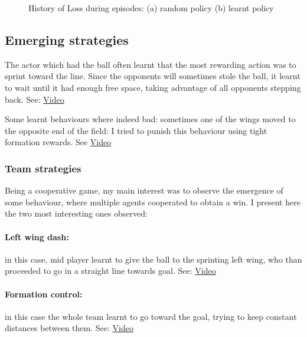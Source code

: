 \documentclass{article}
\begin{document}
\begin{figure}[H]
    \caption{History of Loss during episodes: (a) random policy (b) learnt policy}
    \label{fig:loss}
\end{figure}

\subsection{Emerging strategies}
The actor which had the ball often learnt that the most rewarding action was to sprint toward the line. Since the opponents will sometimes stole the ball, it learnt to wait until it had enough free space, taking advantage of all opponents stepping back. See: \href{https://liveunibo-my.sharepoint.com/:v:/g/personal/francesco_cerri2_studio_unibo_it/EXD7v0xTqkJKmSTcseH-SYgBhnYLIVJ_mLJ-ZrSqKwEzIw?e=SjpQO0}{Video}

Some learnt behaviours where indeed bad: sometimes one of the wings moved to the opposite end of the field: I tried to punish this behaviour using tight formation rewards. See \href{https://liveunibo-my.sharepoint.com/:v:/g/personal/francesco_cerri2_studio_unibo_it/ERVwKpW700tGqjXVjQFbQKQBQ01NKnrTrCrRNBNnT3mwSw?e=uj11Tc}{Video}

\subsubsection{Team strategies}
Being a cooperative game, my main interest was to observe the emergence of some behaviour, where multiple agents cooperated to obtain a win. I present here the two most interesting ones observed:
\paragraph{Left wing dash:} in this case, mid player learnt to give the ball to the sprinting left wing, who than proceeded to go in a straight line towards goal.  See: \href{https://liveunibo-my.sharepoint.com/:v:/g/personal/francesco_cerri2_studio_unibo_it/EapBlMrr7rVNvxdAm3NS0CMBqV2cXgbs3pdIZNzUwm-aZw?e=Ft040B}{Video}
\paragraph{Formation control:} in this case the whole team learnt to go toward the goal, trying to keep constant distances between them.  See: \href{https://liveunibo-my.sharepoint.com/:v:/g/personal/francesco_cerri2_studio_unibo_it/EWOCkaSewypKv1cZChLtnRgBtAv4HJSXdM-Kme-9FIPLSg?e=X4kjdg}{Video}
\end{document}
